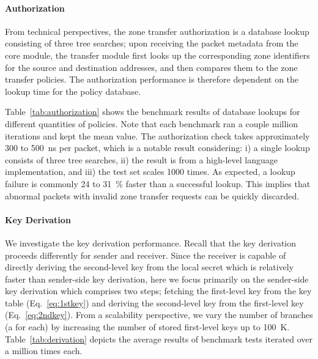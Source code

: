 \paragraph{Authorization}
From technical perspectives, the zone transfer authorization is a database lookup consisting
of three tree searches;
upon receiving the packet metadata from the core module, the transfer module first looks
up the corresponding zone identifiers for the source and destination addresses, and then
compares them to the zone transfer policies. The authorization performance is therefore
dependent on the lookup time for the policy database.

Table~\ref{tab:authorization} shows
the benchmark results of database lookups for different quantities of policies.
Note that each benchmark ran a couple million iterations and kept the mean value.
The authorization check takes approximately 300 to \SI{500}{ns} per packet, which is a
notable result considering: i) a single lookup consists of three tree searches, ii) the result
is from a high-level language implementation, and iii) the test set scales 1000 times.
As expected, a lookup failure is commonly 24 to 31~\% faster than a successful lookup.
This implies that abnormal packets with invalid zone transfer requests can be quickly
discarded.


\paragraph{Key Derivation}
We investigate the key derivation performance. Recall that the key derivation proceeds
differently for sender and receiver. Since the receiver is capable of directly deriving the
second-level key from the local secret which is relatively faster than sender-side key
derivation, here we focus primarily on the sender-side key derivation which comprises two steps;
fetching the first-level key from the key table (Eq.~\ref{eq:1stkey}) and deriving the
second-level key from the first-level key (Eq.~\ref{eq:2ndkey}). From a scalability
perspective, we vary the number of branches (a \tp for each) by increasing the number of stored
first-level keys up to \SI{100}{K}. Table~\ref{tab:derivation} depicts the average results of
benchmark tests iterated over a million times each.

